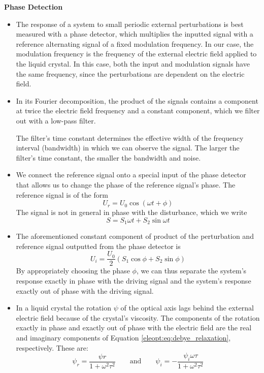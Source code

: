 \documentclass[11pt, a4paper]{article}
\newcommand{\eqtext}[1]{\qquad \text{#1} \qquad}
\begin{document}
\textbf{Phase Detection}
\begin{itemize}
	\item The response of a system to small periodic external perturbations is best measured with a phase detector, which multiplies the inputted signal with a reference alternating signal of a fixed modulation frequency. In our case, the modulation frequency is the frequency of the external electric field applied to the liquid crystal. In this case, both the input and modulation signals have the same frequency, since the perturbations are dependent on the electric field.  
	
	\item In its Fourier decomposition, the product of the signals contains a component at twice the electric field frequency and a constant component, which we filter out with a low-pass filter. 
	
	The filter's time constant determines the effective width of the frequency interval (bandwidth) in which we can observe the signal. The larger the filter's time constant, the smaller the bandwidth and noise.
	
	\item We connect the reference signal onto a special input of the phase detector that allows us to change the phase of the reference signal's phase. The reference signal is of the form
	\begin{equation*}
		U_{r} = U_{0} \cos (\omega t + \phi)
	\end{equation*}
	The signal is not in general in phase with the disturbance, which we write
	\begin{equation*}
		S = S_{1} \omega t + S_{2} \sin \omega t
	\end{equation*}
	
	\item The aforementioned constant component of product of the perturbation and reference signal outputted from the phase detector is 
	\begin{equation*}
		U_{i} = \frac{U_{0}}{2} (S_{1}\cos \phi + S_{2}\sin \phi)
	\end{equation*}
	By appropriately choosing the phase $ \phi $, we can thus separate the system's response exactly in phase with the driving signal and the system's response exactly out of phase with the driving signal.
	
	\item In a liquid crystal the rotation $ \psi $ of the optical axis lags behind the external electric field because of the crystal's viscosity. The components of the rotation exactly in phase and exactly out of phase with the electric field are the real and imaginary components of Equation \ref{eleopt:eq:debye_relaxation}, respectively. These are:
	\begin{equation}
		\psi_{r} = \frac{\psi{r}}{1 + \omega^{2}\tau^{2}} \eqtext{and} \psi_{i} = - \frac{\psi_{i}\omega \tau}{1 + \omega^{2}\tau^{2}} \label{eleopt:eq:real_im_response}
	\end{equation}
	

\end{itemize}
\end{document}
